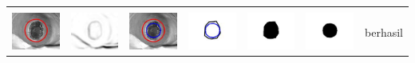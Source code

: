 \begin{table}[H]
\begin{tabular}{|m{0.7in}|m{0.7in}|m{0.7in}|m{0.7in}|m{0.7in}|m{0.7in}|m{0.7in}|}
		&  &  & & & &  \\
		\includegraphics[width=0.7in]{dataset/dataset_3/luka_hitam/ready/7_integer_init.jpg}&
		\includegraphics[width=0.7in]{dataset/dataset_3/luka_hitam/ready/7_integer_ext.jpg}&
		\includegraphics[width=0.7in]{dataset/dataset_3/luka_hitam/ready/7_integer_result.jpg}&
		\includegraphics[width=0.7in]{dataset/dataset_3/luka_hitam/ready/7_gt_r_integer.jpg}&
		\includegraphics[width=0.7in]{dataset/dataset_3/luka_hitam/ready/7_r.jpg}&
		\includegraphics[width=0.7in]{dataset/dataset_3/luka_hitam/ready/7_integer_r.jpg}&
		berhasil\\
		\hline
		

\end{tabular}
\end{table}
